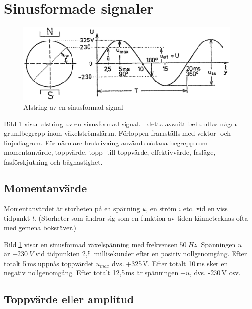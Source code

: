 \section{Sinusformade signaler}

\begin{figure}[ht]
\includegraphics[width=\textwidth]{images/cropped_pdfs/bild_2_1-16.pdf}
\caption{Alstring av en sinusformad signal}
\label{fig:BildII1-16}
\end{figure}

Bild \ref{fig:BildII1-16} visar alstring av en sinusformad signal.
I detta avsnitt behandlas några grundbegrepp inom växelströmsläran.
Förloppen framställs med vektor- och linjediagram.
För närmare beskrivning används sådana begrepp som momentanvärde,
toppvärde, topp- till toppvärde, effektivvärde, fasläge, fasförskjutning och
båghastighet.

\subsection{Momentanvärde}

Momentanvärdet är storheten på en spänning \(u\), en ström \(i\) etc. vid en
viss tidpunkt \(t\).
(Storheter som ändrar sig som en funktion av tiden kännetecknas ofta med gemena
bokstäver.)

Bild \ref{fig:BildII1-16} visar en sinusformad växelspänning med frekvensen
\(50\ Hz\).
Spänningen \(u\) är \(+230\ V\) vid tidpunkten 2,5~millisekunder efter en
positiv nollgenomgång.
Efter totalt 5\,ms uppnås toppvärdet \(u_{max}\) dvs. +325\,V.
Efter totalt 10\,ms sker en negativ nollgenomgång.
Efter totalt 12,5\,ms är spänningen \(-u\), dvs. -230\,V osv.

\subsection{Toppvärde eller amplitud}

